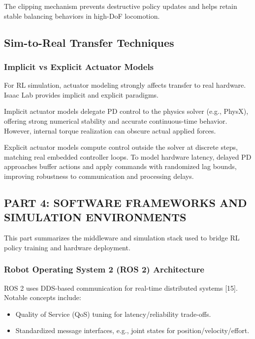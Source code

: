 The clipping mechanism prevents destructive policy updates and helps retain stable balancing behaviors in high-DoF locomotion.

\subsection{Sim-to-Real Transfer Techniques}

\subsubsection*{Implicit vs Explicit Actuator Models}

For RL simulation, actuator modeling strongly affects transfer to real hardware. Isaac Lab provides implicit and explicit paradigms.

Implicit actuator models delegate PD control to the physics solver (e.g., PhysX), offering strong numerical stability and accurate continuous-time behavior. However, internal torque realization can obscure actual applied forces.

Explicit actuator models compute control outside the solver at discrete steps, matching real embedded controller loops. To model hardware latency, delayed PD approaches buffer actions and apply commands with randomized lag bounds, improving robustness to communication and processing delays.

\subsection{PART 4: SOFTWARE FRAMEWORKS AND SIMULATION ENVIRONMENTS}

This part summarizes the middleware and simulation stack used to bridge RL policy training and hardware deployment.

\subsubsection*{Robot Operating System 2 (ROS 2) Architecture}

ROS 2 uses DDS-based communication for real-time distributed systems [15]. Notable concepts include:
\begin{itemize}
    \item Quality of Service (QoS) tuning for latency/reliability trade-offs.
    \item Standardized message interfaces, e.g., joint states for position/velocity/effort.
\end{itemize}

